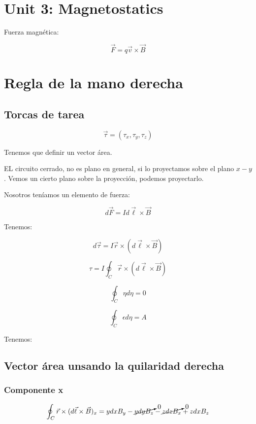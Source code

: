 \documentclass{article}
\begin{document}
\section{Unit 3: Magnetostatics}


Fuerza magnética:


\[  \boxed{ \vec{F} =  q\vec{v} \times \vec{B}  } \]

\section{Regla de la mano derecha}


\subsection{Torcas de tarea}


\[ \vec{\tau} = (\tau_{x},\tau_{y},\tau_{z})  \]


Tenemos que definir un vector área. 


EL circuito cerrado, no es plano en general, si lo proyectamos sobre el plano $x-y$. Vemos un cierto plano sobre la proyección, podemos proyectarlo. 



Nosotros teníamos un elemento de fuerza:



\[ d\vec{F} = Id\vec{\ell}  \times \vec{B} \]



Tenemos:


\[   d\vec{\tau} = I\vec{r} \times (d\vec{\ell}\times \vec{B})    \]




\[ \tau = I \oint_{C} \vec{r} \times (d\vec{\ell}\times \vec{B} )  \]


\[ \oint_{C} \eta d\eta =0 \]


\[ \oint_{C} \epsilon d\eta =A \]


Tenemos:


\subsection{Vector área unsando la quilaridad derecha}


\subsubsection{Componente x}


\[ \oint_{C} \vec{r} \times (d\vec{\ell}  \times \vec{B} )_{x} =ydxB_{y}-\cancelto{0}{ydyB_{z}}-\cancelto{0}{zdzB_{x}}+zdxB_{z}  \]
\end{document}
